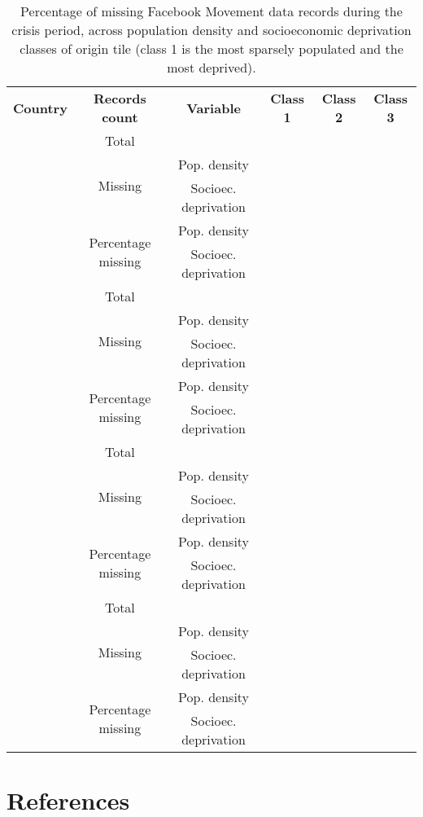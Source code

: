 \documentclass[
  11pt,
]{article}
\begin{document}
\begin{table}[ht]
 \centering 
 \captionsetup{width=\textwidth}
 \caption{Percentage of missing Facebook Movement data records during the crisis period, across population density and socioeconomic deprivation classes of origin tile (class 1 is the most sparsely populated and the most deprived).} 
 
\begin{tabular}{cccccc}
  \multirow{2}{*}{\textbf{Country}} & \multirow{2}{*}{\textbf{Records count}} & \multirow{2}{*}{\textbf{Variable}} & \multirow{2}{*}{\textbf{Class 1}} & \multirow{2}{*}{\textbf{Class 2}} & \multirow{2}{*}{\textbf{Class 3}}\\
  & & & & \\
  \Xhline{1.5pt}
   
  \multirow{5}{*}{ \;\; Argentina \;\; } & \;\;Total\;\; & & & & \\ 
  \cline{2-6}
  & \multirow{2}{*}{Missing} & \;\;Pop. density\;\; & & & \\
  & & \;\;Socioec. deprivation\;\; & & & \\
  \cline{2-6}
  & \multirow{2}{*}{Percentage missing} &  \;\;Pop. density\;\; & & & \\
  & & \;\;Socioec. deprivation\;\; & & & \\
  \Xhline{1.5pt}
  
  \multirow{5}{*}{ \;\; Chile \;\; } & \;\;Total\;\; & & & & \\ 
  \cline{2-6}
  & \multirow{2}{*}{Missing} & \;\;Pop. density\;\; & & & \\
  & & \;\;Socioec. deprivation\;\; & & & \\
  \cline{2-6}
  & \multirow{2}{*}{Percentage missing} &  \;\;Pop. density\;\; & & & \\
  & & \;\;Socioec. deprivation\;\; & & & \\
  \Xhline{1.5pt}
  
  \multirow{5}{*}{ \;\; Colombia \;\; } & \;\;Total\;\; & & & & \\ 
  \cline{2-6}
  & \multirow{2}{*}{Missing} & \;\;Pop. density\;\; & & & \\
  & & \;\;Socioec. deprivation\;\; & & & \\
  \cline{2-6}
  & \multirow{2}{*}{Percentage missing} &  \;\;Pop. density\;\; & & & \\
  & & \;\;Socioec. deprivation\;\; & & & \\
  \Xhline{1.5pt}
  
  \multirow{5}{*}{ \;\; Mexico \;\; } & \;\;Total\;\; & & & & \\ 
  \cline{2-6}
  & \multirow{2}{*}{Missing} & \;\;Pop. density\;\; & & & \\
  & & \;\;Socioec. deprivation\;\; & & & \\
  \cline{2-6}
  & \multirow{2}{*}{Percentage missing} &  \;\;Pop. density\;\; & & & \\
  & & \;\;Socioec. deprivation\;\; & & & \\
  
 \end{tabular}
\vspace{5mm}
\end{table}

\section{References}\label{references}
\end{document}
